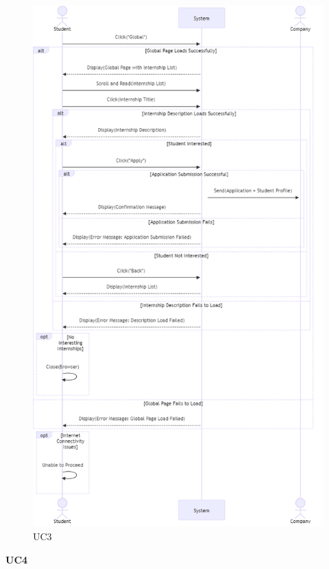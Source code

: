 \begin{figure}[H]
    \centering
    \includegraphics[width=0.5\linewidth]{RASD//Images/UC3.png}
    \caption{UC3}
\end{figure}

\pagebreak
\textbf{UC4}

